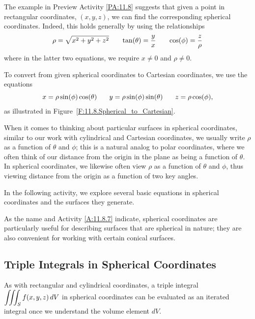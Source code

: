 The example in Preview Activity \ref{PA:11.8} suggests that given a point in rectangular coordinates, $(x,y,z)$, we can find the corresponding spherical coordinates.  Indeed, this holds generally by using the relationships
\[\rho  = \sqrt{x^2  + y^2 + z^2}  \hspace{0.25in} \tan(\theta) = \frac{y}{x}  \hspace{0.25in} \cos(\phi) = \frac{z}{\rho} \]
where in the latter two equations, we require $x \ne 0$ and $\rho \ne 0$.

To convert from given spherical coordinates to Cartesian coordinates, we use the equations 
\[x = \rho \sin(\phi) \cos(\theta) \hspace{0.25in} y = \rho \sin(\phi) \sin(\theta) \hspace{0.25in} z = \rho \cos(\phi),\]
as illustrated in Figure~\ref{F:11.8.Spherical_to_Cartesian}.

%

When it comes to thinking about particular surfaces in spherical coordinates, similar to our work with cylindrical and Cartesian coordinates, we usually write $\rho$ as a function of $\theta$ and $\phi$; this is a natural analog to polar coordinates, where we often think of our distance from the origin in the plane as being a function of $\theta$.  In spherical coordinates, we likewise often view $\rho$ as a function of $\theta$ and $\phi$, thus viewing distance from the origin as a function of two key angles.  

In the following activity, we explore several basic equations in spherical coordinates and the surfaces they generate.



As the name and Activity \ref{A:11.8.7} indicate, spherical coordinates are particularly useful for describing surfaces that are spherical in nature; they are also convenient for working with certain conical surfaces.

\subsection*{Triple Integrals in Spherical Coordinates}

As with rectangular and cylindrical coordinates, a triple integral $\displaystyle \iiint_S f(x,y,z) \, dV$ in spherical coordinates can be evaluated as an iterated integral once we understand the volume element $dV$.




